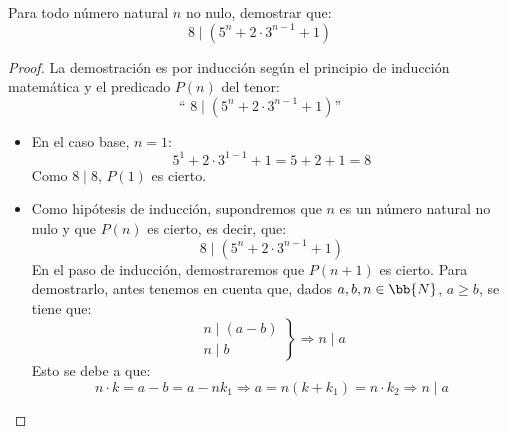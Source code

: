 \begin{ejercicio}
    Para todo número natural $n$ no nulo, demostrar que:
    $$8\mid \left(5^n + 2\cdot 3^{n-1}+1\right)$$

    \begin{proof}
        La demostración es por inducción según el principio de inducción matemática y el predicado $P(n)$ del tenor:
        $$\text{`` }8\mid \left(5^n + 2\cdot 3^{n-1}+1\right)\text{''}$$

        \begin{itemize}
            \item En el caso base, $n=1$:
                $$5^1 + 2\cdot 3^{1-1}+1 = 5+2+1 = 8$$
                Como $8\mid 8$, $P(1)$ es cierto.

            \item Como hipótesis de inducción, supondremos que $n$ es un número natural no nulo y que $P(n)$ es cierto, es decir, que:
                $$8\mid \left(5^n + 2\cdot 3^{n-1}+1\right)$$
                En el paso de inducción, demostraremos que $P(n+1)$ es cierto.
                Para demostrarlo, antes tenemos en cuenta que, dados $a,b,n\in \bb{N}$, $a\geq b$, se tiene que:
                \begin{equation*}
                    \left.\begin{array}{l}
                        n\mid (a-b) \\
                        n\mid b
                    \end{array} \right\} \Longrightarrow n\mid a
                \end{equation*}
                Esto se debe a que:
                \begin{equation*}
                    n\cdot k = a-b = a-nk_1 \Longrightarrow a = n(k+k_1) = n\cdot k_2 \Longrightarrow n\mid a
                \end{equation*}


\end{itemize}
\end{proof}
\end{ejercicio}
